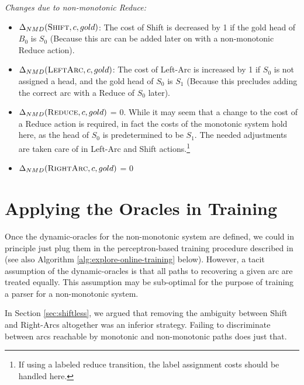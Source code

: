 \documentclass[11pt,letterpaper]{article}
\begin{document}
\noindent \emph{Changes due to non-monotonic Reduce:}
\begin{itemize}

   \item $\Delta_{NMD}(\textsc{Shift},c,gold)$: The cost of Shift is decreased
      by 1 if the gold head of $B_0$ is $S_0$ (Because this arc can be added
      later on with a non-monotonic Reduce action).

   \item $\Delta_{NMD}(\textsc{LeftArc},c,gold)$: The cost of Left-Arc is
      increased by 1 if $S_0$ is not assigned a head, and the gold head of
      $S_0$ is $S_{1}$ (Because this precludes adding the correct arc
      with a Reduce of $S_0$ later).

   \item $\Delta_{NMD}(\textsc{Reduce},c,gold)$ = 0. While it may seem that a
      change to the cost of a Reduce action is required, in fact the costs of
      the monotonic system hold here, as the head of $S_0$ is predetermined to
      be $S_1$.  The needed adjustments are taken care of
      in Left-Arc and Shift actions.\footnote{If using a labeled reduce transition,
      the label assignment costs should be handled here.}

   \item $\Delta_{NMD}(\textsc{RightArc},c,gold)$ = 0
\end{itemize}

\section{Applying the Oracles in Training}

Once the dynamic-oracles for the non-monotonic system are defined, we could in
principle just plug them in the perceptron-based training procedure described
in \citet{goldberg:12} (see also Algorithm \ref{alg:explore-online-training}
below).
However, a tacit assumption of the dynamic-oracles is that all paths to
recovering a given arc are treated equally. This assumption may be sub-optimal
for the purpose of training a parser for a non-monotonic system.

In Section \ref{sec:shiftless}, we argued that removing the ambiguity between
Shift and Right-Arcs altogether was an inferior strategy. Failing to discriminate
between arcs reachable by monotonic and non-monotonic paths does just that.
\end{document}
